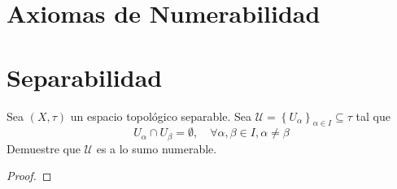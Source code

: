 \documentclass[12pt]{report}
\theoremstyle{largebreak}
\begin{document}
    \section{Axiomas de Numerabilidad}

    \section{Separabilidad}

    \begin{excer}
        Sea $(X,\tau)$ un espacio topológico separable. Sea $\mathcal{U}=\left\{U_\alpha \right\}_{\alpha\in I}\subseteq\tau$ tal que
        \begin{equation*}
            U_\alpha\cap U_\beta=\emptyset,\quad\forall \alpha,\beta\in I,\alpha\neq\beta
        \end{equation*}
        Demuestre que $\mathcal{U}$ es a lo sumo numerable.
    \end{excer}

    \begin{proof}
        
    \end{proof}
\end{document}
